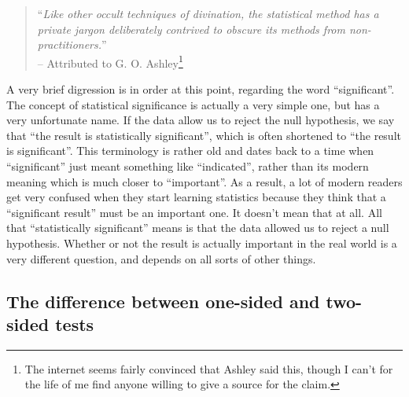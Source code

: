 \documentclass[
  a4paper,
]{book}
\begin{document}
\begin{quote}
``\emph{Like other occult techniques of divination, the statistical
method has a private jargon deliberately contrived to obscure its
methods from non-practitioners.}''\\
-- Attributed to G. O. Ashley\footnote{The internet seems fairly
  convinced that Ashley said this, though I can't for the life of me
  find anyone willing to give a source for the claim.}
\end{quote}

A very brief digression is in order at this point, regarding the word
``significant''. The concept of statistical significance is actually a
very simple one, but has a very unfortunate name. If the data allow us
to reject the null hypothesis, we say that ``the result is statistically
significant'', which is often shortened to ``the result is
significant''. This terminology is rather old and dates back to a time
when ``significant'' just meant something like ``indicated'', rather
than its modern meaning which is much closer to ``important''. As a
result, a lot of modern readers get very confused when they start
learning statistics because they think that a ``significant result''
must be an important one. It doesn't mean that at all. All that
``statistically significant'' means is that the data allowed us to
reject a null hypothesis. Whether or not the result is actually
important in the real world is a very different question, and depends on
all sorts of other things.

\hypertarget{sec-The-difference-between-one-sided-and-two-sided-tests}{%
\subsection{The difference between one-sided and two-sided
tests}\label{sec-The-difference-between-one-sided-and-two-sided-tests}}
\end{document}

